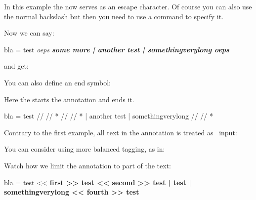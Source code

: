 In this example the \type {/} now serves as an escape character. Of course you
can also use the normal backslash but then you need to use a command to specify
it.

\startbuffer[setup]
\setuptyping
  [annotatedtyping]
  [escape=\letterbackslash]
\stopbuffer

\typebuffer[setup][option=TEX] \getbuffer[setup]

Now we can say:

\startbuffer[example]
\startannotatedtyping
bla = test               \bgroup \sl oeps \egroup
                         \bgroup \bf some more \egroup
    | another test
    | somethingverylong  \bgroup \it oeps \egroup
\stopannotatedtyping
\stopbuffer

\typebuffer[example][option=TEX]

and get:

\starttextbackground[example]
    \getbuffer[example]
\stoptextbackground

You can also define an end symbol:

\startbuffer[setup]
\setuptyping
  [annotatedtyping]
  [escape={//,*},
   color=darkblue]

\stopbuffer

\typebuffer[setup][option=TEX] \getbuffer[setup]

Here the \type {//} starts the annotation and \type {*} ends it.

\startbuffer[example]
\startannotatedtyping
bla = test               // \black //  *
                         // \black //  *
    | another test
    | somethingverylong  // \black //  *
\stopannotatedtyping
\stopbuffer

\typebuffer[example][option=TEX]

Contrary to the first example, all text in the annotation is treated as \TEX\
input:

\starttextbackground[example]
    \getbuffer[example]
\stoptextbackground

You can consider using more balanced tagging, as in:

\startbuffer[setup]
\setuptyping
  [annotatedtyping]
  [escape={<<,>>},
   color=darkblue]
\stopbuffer

\typebuffer[example][option=TEX]

Watch how we limit the annotation to part of the text:

\startbuffer[example]
\startannotatedtyping
bla = test               << \rm\bf first  >> test
                         << \rm\bf second >> test
    | test
    | somethingverylong  << \rm\bf fourth >> test
\stopannotatedtyping
\stopbuffer

